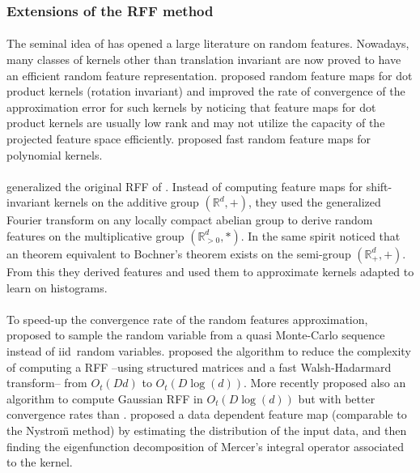 \subsubsection{Extensions of the RFF method}
\paragraph{}
The seminal idea of \citet{Rahimi2007} has opened a large literature on random
features. Nowadays, many classes of kernels other than translation invariant are
now proved to have an efficient random feature representation.
\citet{kar2012random} proposed random feature maps for dot product kernels
(rotation invariant) and \citet{hamid2014compact} improved the rate of
convergence of the approximation error for such kernels by noticing that
feature maps for dot product kernels are usually low rank and may not utilize
the capacity of the projected feature  space  efficiently. 
proposed fast random feature maps for polynomial kernels.
\paragraph{}
 generalized the original \acs{RFF} of \citet{Rahimi2007}.
Instead of computing feature maps for shift-in\-va\-riant kernels on the
additive group $(\mathbb{R}^d, +)$, they used the generalized Fourier transform
on any locally compact abelian group to derive random features on the
multiplicative group $(\mathbb{R}^d_{>0}, *)$. In the same spirit
\citet{yang2014random} noticed that an theorem equivalent to Bochner's theorem
exists on the semi-group $(\mathbb{R}_+^d, +)$. From this they derived
 features and used them to approximate kernels adapted to
learn on histograms.
\paragraph{}
To speed-up the convergence rate of the random features approximation,
\citet{yang2014quasi} proposed to sample the random variable from a quasi
Monte-Carlo sequence instead of \acs{iid}~random variables. 
proposed the  algorithm to reduce the complexity of computing a
\acs{RFF} --using structured matrices and a fast Walsh-Hadarmard transform--
from $O_t(Dd)$ to $O_t(D\log(d))$. More recently \citet{felix2016orthogonal}
proposed also an algorithm  to compute Gaussian \acs{RFF} in
$O_t(D\log(d))$ but with better convergence rates than 
\citep{Le2013}.   proposed a data dependent feature
map (comparable to the Nystro\"m method) by estimating the distribution of the
input data, and then finding the eigenfunction decomposition of Mercer's
integral operator associated to the kernel.
